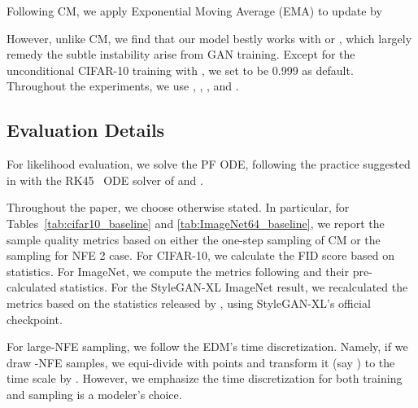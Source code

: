 \documentclass{article} \usepackage{iclr2024_coNFErence,times}
\theoremstyle{definition}
\theoremstyle{remark}
\begin{document}
Following CM, we apply Exponential Moving Average (EMA) to update  by

However, unlike CM, we find that our model bestly works with  or , which largely remedy the subtle instability arise from GAN training. Except for the unconditional CIFAR-10 training with , we set  to be 0.999 as default. Throughout the experiments, we use , , , and .

\subsection{Evaluation Details}\label{appendix:sampling_details}

For likelihood evaluation, we solve the PF ODE, following the practice suggested in \citet{kim2022maximum} with the RK45~\citep{dormand1980family} ODE solver of  and . 

Throughout the paper, we choose  otherwise stated. In particular, for Tables~\ref{tab:cifar10_baseline} and \ref{tab:ImageNet64_baseline}, we report the sample quality metrics based on either the one-step sampling of CM or the  sampling for NFE 2 case. For CIFAR-10, we calculate the FID score based on \citet{karras2022elucidating} statistics. For ImageNet, we compute the metrics following \citet{dhariwal2021diffusion} and their pre-calculated statistics. For the StyleGAN-XL ImageNet result, we recalculated the metrics based on the statistics released by \citet{dhariwal2021diffusion}, using StyleGAN-XL's official checkpoint.

For large-NFE sampling, we follow the EDM's time discretization. Namely, if we draw -NFE samples, we equi-divide  with  points and transform it (say ) to the time scale by . However, we emphasize the time discretization for both training and sampling is a modeler's choice.
\end{document}
